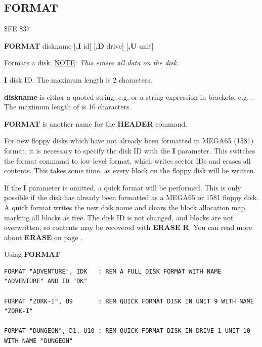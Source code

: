 \subsection{FORMAT}
\begin{description}[leftmargin=2cm,style=nextline]
\item [Token:]    \$FE \$37

\item [Format:]   {\bf FORMAT} diskname [{\bf,I} id] [{\bf,D} drive] [{\bf,U} unit]

\item [Usage:]    Formats a disk. \underline{NOTE}: {\em This erases all data on the disk.}

                  {\bf I} disk ID. The maximum length is 2 characters.

                  {\bf diskname} is either a quoted string, e.g.  or a string expression in brackets, e.g. . The maximum length of is 16 characters.

                  \drivedefinition

                  \unitdefinition

\item [Remarks:]  {\bf FORMAT} is another name for the {\bf HEADER} command.

                  For new floppy disks which have not already been formatted in MEGA65 (1581) format, it is necessary to specify the disk ID with the {\bf I} parameter. This switches the format command to low level format, which writes sector IDs and erases all contents. This takes some time, as every block on the floppy disk will be written.

                  If the {\bf I} parameter is omitted, a quick format will be performed. This is only possible if the disk has already been formatted as a MEGA65 or 1581 floppy disk. A quick format writes the new disk name and clears the block allocation map, marking all blocks as free. The disk ID is not changed, and blocks are not overwritten, so contents may be recovered with {\bf ERASE R}. You can read more about {\bf ERASE} on page \pageref{BASIC 65 Commands!ERASE}.

\item [Examples:] Using {\bf FORMAT}

\begin{tcolorbox}[colback=black,coltext=white]
\verbatimfont{\codefont}
\begin{verbatim}
FORMAT "ADVENTURE", IDK   : REM A FULL DISK FORMAT WITH NAME "ADVENTURE" AND ID "DK"

FORMAT "ZORK-I", U9       : REM QUICK FORMAT DISK IN UNIT 9 WITH NAME "ZORK-I"

FORMAT "DUNGEON", D1, U10 : REM QUICK FORMAT DISK IN DRIVE 1 UNIT 10 WITH NAME "DUNGEON"
\end{verbatim}
\end{tcolorbox}
\end{description}

